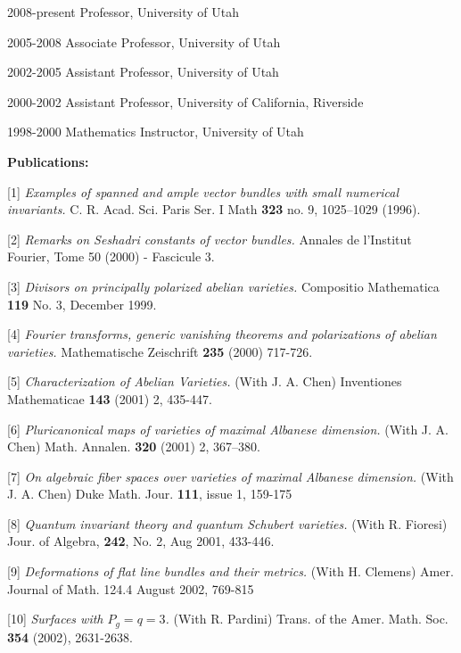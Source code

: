 \documentclass[12pt] {amsart}
\begin{document}
2008-present Professor, University of  Utah

2005-2008 Associate Professor, University of  Utah

2002-2005 Assistant Professor, University of Utah

2000-2002 Assistant Professor, University of California, Riverside

1998-2000 Mathematics Instructor, University of Utah





\newpage

\noindent
{\bf \large Publications:}

[1] {\it Examples of spanned and ample vector bundles with small 
numerical invariants.}
C. R. Acad. Sci. Paris Ser. I Math {\bf 323} no. 9, 1025--1029 
(1996).

[2] {\it Remarks on Seshadri constants of vector bundles.} 
Annales de l'Institut Fourier, Tome 50 (2000) - Fascicule 3.

[3] {\it Divisors on principally polarized abelian varieties.} 
Compositio Mathematica {\bf 119} No. 3, December 1999.

[4] {\it Fourier transforms, generic vanishing theorems and polarizations of
abelian varieties.} 
Mathematische
Zeischrift {\bf 235} (2000) 717-726.

[5] {\it Characterization of Abelian Varieties.} (With J. A. Chen) 
Inventiones Mathematicae {\bf 143} (2001) 2, 435-447.

[6] {\it Pluricanonical maps of varieties of maximal Albanese dimension.}
(With J. A. Chen) Math. Annalen. {\bf 320} (2001) 2, 367--380.

[7] {\it  On algebraic fiber spaces over varieties of maximal Albanese 
dimension.} (With J. A. Chen) Duke Math. Jour. {\bf 111}, issue 1, 159-175

[8] {\it Quantum invariant theory and quantum Schubert varieties.} 
(With R. Fioresi) Jour. of Algebra, {\bf 242}, No. 2, Aug 2001, 433-446.

[9] {\it Deformations of flat line bundles and their metrics.}
(With H. Clemens) Amer. Journal of Math. 124.4 August 2002, 769-815

[10] {\it Surfaces with $P_g=q=3$.} 
(With R. Pardini) Trans. of the Amer. Math. Soc. {\bf 354} (2002), 2631-2638.
\end{document}
